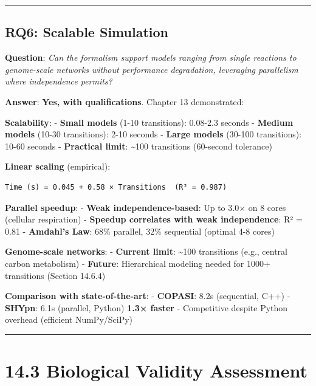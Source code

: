 \begin{center}\rule{0.5\linewidth}{0.5pt}\end{center}

\hypertarget{rq6-scalable-simulation}{%
\subsection{RQ6: Scalable Simulation}\label{rq6-scalable-simulation}}

\textbf{Question}: \emph{Can the formalism support models ranging from
single reactions to genome-scale networks without performance
degradation, leveraging parallelism where independence permits?}

\textbf{Answer}: \textbf{Yes, with qualifications}. Chapter 13
demonstrated:

\textbf{Scalability}: - \textbf{Small models} (1-10 transitions):
0.08-2.3 seconds - \textbf{Medium models} (10-30 transitions): 2-10
seconds - \textbf{Large models} (30-100 transitions): 10-60 seconds -
\textbf{Practical limit}: \textasciitilde100 transitions (60-second
tolerance)

\textbf{Linear scaling} (empirical):

\begin{lstlisting}
Time (s) = 0.045 + 0.58 × Transitions  (R² = 0.987)
\end{lstlisting}

\textbf{Parallel speedup}: - \textbf{Weak independence-based}: Up to
3.0× on 8 cores (cellular respiration) - \textbf{Speedup correlates with
weak independence}: R² = 0.81 - \textbf{Amdahl's Law}: 68\% parallel,
32\% sequential (optimal 4-8 cores)

\textbf{Genome-scale networks}: - \textbf{Current limit}:
\textasciitilde100 transitions (e.g., central carbon metabolism) -
\textbf{Future}: Hierarchical modeling needed for 1000+ transitions
(Section 14.6.4)

\textbf{Comparison with state-of-the-art}: - \textbf{COPASI}: 8.2s
(sequential, C++) - \textbf{SHYpn}: 6.1s (parallel, Python) \textrightarrow
\textbf{1.3× faster} - Competitive despite Python overhead (efficient
NumPy/SciPy)

\begin{center}\rule{0.5\linewidth}{0.5pt}\end{center}

\hypertarget{biological-validity-assessment}{%
\section{14.3 Biological Validity
Assessment}\label{biological-validity-assessment}}

